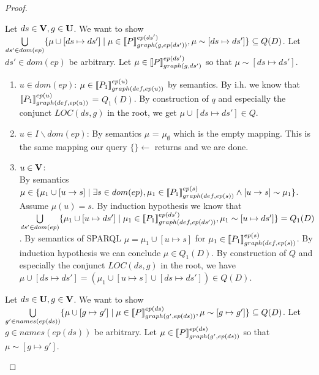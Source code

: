 \begin{proof}
\begin{enumerate}
			\bigskip\noindent
			Let $ds \in \mathbf{V},g \in \mathbf{U}$.
			We want to show  
			$\bigcup\limits_{ds' \in dom(ep)} \{ \mu \cup [ds \mapsto ds'] \mid \mu \in
			\llbracket P\rrbracket^{ep(ds')}_{graph(g,ep(ds'))}, \mu \sim  [ds\mapsto ds'] \}  
			\subseteq Q(D)$.
			Let $ds' \in dom(ep)$ be arbitrary.
			Let $\mu \in \llbracket P \rrbracket^{ep(ds')}_{graph(g,ds')}$ so that $\mu \sim
			[ds\mapsto ds']$.
			\begin{enumerate}
				\item  $u \in dom(ep)$:
					$\mu \in \llbracket P_1\rrbracket^{ep(u)}_{graph(def,ep(u))}$ by semantics.
					By i.h. we know that 
					$\llbracket P_1 \rrbracket^{ep(u)}_{graph(def,ep(u))}$ =
					$Q_1(D)$. By construction of $q$ and especially the conjunct
					$LOC(ds,g)$ in the root, we get $\mu\cup[ds \mapsto ds'] \in Q$.
				\item $u \in I\backslash dom(ep)$:
					By semantics $\mu$ = $\mu_\emptyset$ which is the empty
					mapping. This is the same mapping our query
					$\{\} \leftarrow$ returns and we are
					done.
				\item $u \in \mathbf{V}$:\\
					By semantics $\mu \in \{ \mu_1 \cup [u \rightarrow s ] \mid
						\exists s \in dom(ep), \mu_1 \in \llbracket P_1
						\rrbracket^{ep(s)}_{graph(def,ep(s))} \land
					[u \rightarrow s] \sim \mu_1 \}$. Assume $\mu(u) = s$.
					By induction hypothesis we know that 
					$\bigcup\limits_{ds' \in dom(ep)} \{ \mu_1 \cup [u
						\mapsto ds'] \mid \mu_1 \in
						\llbracket P_1\rrbracket^{ep(ds')}_{graph(def,ep(ds'))},
					\mu_1 \sim [u\mapsto ds'] \}  =
					Q_1(D) $. By semantics of SPARQL $\mu = \mu_1 \cup
					[u \mapsto s]$ for $\mu_1 \in \llbracket P_1 \rrbracket^{ep(s)}_{graph(def,ep(s))}$.
					By induction hypothesis we can conclude
					$\mu \in Q_1(D)$.
					By construction of $Q$ and especially the conjunct
					$LOC(ds,g)$ in the root, we have 
					$\mu \cup [ds\mapsto ds'] = (\mu_1 \cup [u
					\mapsto s] \cup [ds \mapsto ds']) \in Q(D)$. 
			\end{enumerate}

			\bigskip\noindent
			Let $ds \in \mathbf{U},g \in \mathbf{V}$.
			We want to show  $\bigcup\limits_{g' \in names(ep(ds))}\{ \mu \cup [g
				\mapsto g'] \mid \mu \in \llbracket P\rrbracket^{ep(ds)}_{graph(g',ep(ds))},
			\mu \sim	[g\mapsto g'] \} \subseteq Q(D)$.
			Let $g \in names(ep(ds))$ be arbitrary.
			Let $\mu \in \llbracket P \rrbracket^{ep(ds)}_{graph(g',ep(ds))}$ so that $\mu \sim
			[g\mapsto g']$.


\end{enumerate}
\end{proof}
